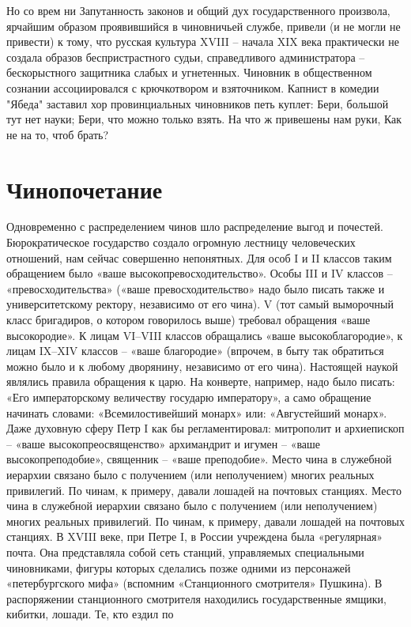 \documentclass[12pt,a4paper]{article}
\begin{document}
Но со врем ни Запутанность законов и общий дух государственного
произвола, ярчайшим образом проявившийся
в чиновничьей службе, привели (и не могли не привести)
к тому, что русская культура XVIII  – начала XIX века
практически не создала образов беспристрастного судьи,
справедливого администратора – бескорыстного защитника
слабых и угнетенных. Чиновник в общественном сознании
ассоциировался с крючкотвором и взяточником.
Капнист в комедии  "Ябеда" заставил хор провинциальных чиновников петь
куплет:
Бери, большой тут нет науки;
Бери, что можно только взять.
На что ж привешены нам руки,
Как не на то, чтоб брать?
\section{Чинопочетание}
Одновременно с распределением чинов шло
распределение выгод и почестей. Бюрократическое
государство создало огромную лестницу человеческих отношений, нам сейчас совершенно непонятных.
Для особ I и II классов таким обращением было
«ваше высокопревосходительство». Особы III и IV классов –
«превосходительства» («ваше превосходительство» надо
было писать также и университетскому ректору, независимо
от его чина). V (тот самый выморочный класс бригадиров,
о котором говорилось выше) требовал обращения «ваше
высокородие». К лицам VI–VIII классов обращались «ваше
высокоблагородие», к лицам IX–XIV классов – «ваше
благородие» (впрочем, в быту так обратиться можно было
и к любому дворянину, независимо от его чина). Настоящей
наукой являлись правила обращения к царю. На конверте,
например, надо было писать: «Его императорскому
величеству государю императору», а само обращение
начинать словами: «Всемилостивейший монарх» или:
«Августейший монарх». Даже духовную сферу Петр I как бы
регламентировал: митрополит и архиепископ – «ваше
высокопреосвященство» архимандрит и игумен – «ваше высокопреподобие», священник – «ваше преподобие».
Место чина в служебной иерархии связано было
с получением (или неполучением) многих реальных
привилегий. По чинам, к примеру, давали лошадей на
почтовых станциях.
Место чина в служебной иерархии связано было
с получением (или неполучением) многих реальных
привилегий. По чинам, к примеру, давали лошадей на
почтовых станциях.
В XVIII веке, при Петре I, в России учреждена была
«регулярная» почта. Она представляла собой сеть станций,
управляемых специальными чиновниками, фигуры которых
сделались позже одними из персонажей «петербургского
мифа» (вспомним «Станционного смотрителя» Пушкина).
В распоряжении станционного смотрителя находились
государственные ямщики, кибитки, лошади. Те, кто ездил по
\end{document}
